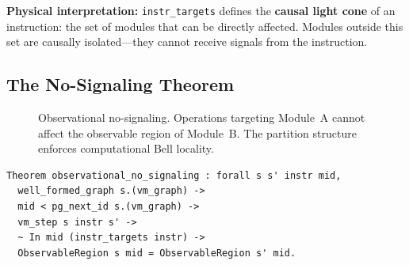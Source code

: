 \textbf{Physical interpretation:} \texttt{instr\_targets} defines the \textbf{causal light cone} of an instruction: the set of modules that can be directly affected. Modules outside this set are causally isolated---they cannot receive signals from the instruction.

\subsection{The No-Signaling Theorem}


\begin{figure}[H]
\centering
{}
\caption{Observational no-signaling. Operations targeting Module~A cannot affect the observable region of Module~B. The partition structure enforces computational Bell locality.}
\label{fig:no-signaling}
\end{figure}

\begin{theorem}
\begin{lstlisting}
Theorem observational_no_signaling : forall s s' instr mid,
  well_formed_graph s.(vm_graph) ->
  mid < pg_next_id s.(vm_graph) ->
  vm_step s instr s' ->
  ~ In mid (instr_targets instr) ->
  ObservableRegion s mid = ObservableRegion s' mid.
\end{lstlisting}
\end{theorem}

